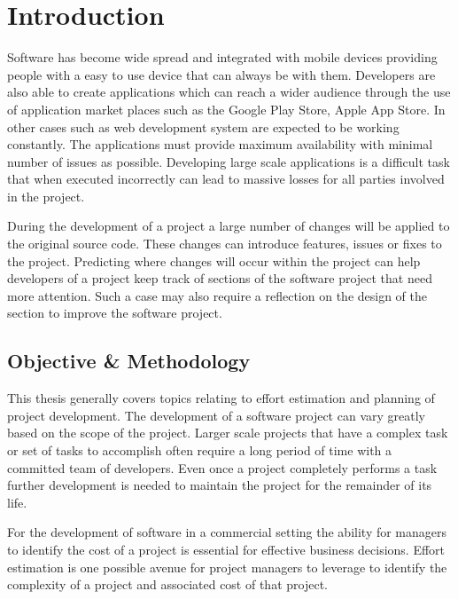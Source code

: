 \chapter{Introduction}
\label{chap:introduction}

Software has become wide spread and integrated with mobile devices providing people with a easy to use device that can always be with them. Developers are also able to create applications which can reach a wider audience through the use of application market places such as the Google Play Store, Apple App Store. In other cases such as web development system are expected to be working constantly. The applications must provide maximum availability with minimal number of issues as possible. Developing large scale applications is a difficult task that when executed incorrectly can lead to massive losses for all parties involved in the project. 

During the development of a project a large number of changes will be applied to the original source code. These changes can introduce features, issues or fixes to the project. Predicting where changes will occur within the project can help developers of a project keep track of sections of the software project that need more attention. Such a case may also require a reflection on the design of the section to improve the software project.

\section{Objective \& Methodology}

This thesis generally covers topics relating to effort estimation and planning of project development. The development of a software project can vary greatly based on the scope of the project. Larger scale projects that have a complex task or set of tasks to accomplish often require a long period of time with a committed team of developers. Even once a project completely performs a task further development is needed to maintain the project for the remainder of its life.

For the development of software in a commercial setting the ability for managers to identify the cost of a project is essential for effective business decisions. Effort estimation is one possible avenue for project managers to leverage to identify the complexity of a project and associated cost of that project.


